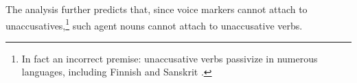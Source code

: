 \documentclass[output=paper,
modfonts
]{LSP/langsci}
\begin{document}
The analysis further predicts that, since voice markers cannot attach to
unaccusatives,\footnote{In fact an incorrect premise:  unaccusative verbs passivize in numerous
  languages, including Finnish and Sanskrit \citep{kiparsky2013}.} such agent nouns cannot attach to
unaccusative verbs.
\end{document}
